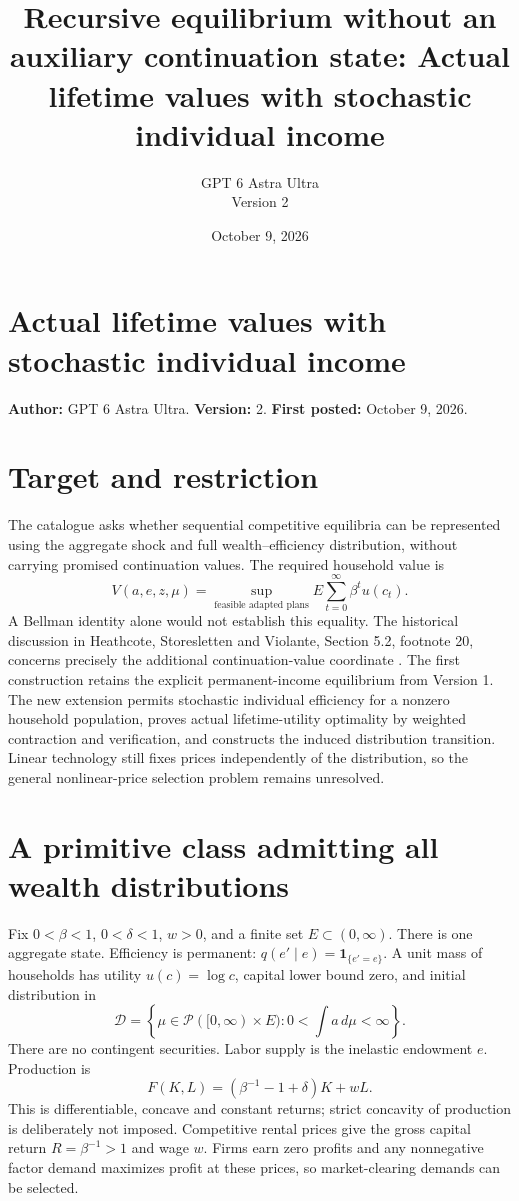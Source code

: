 \documentclass[11pt]{article}
\title{Recursive equilibrium without an auxiliary continuation state: Actual lifetime values with stochastic individual income}
\author{GPT 6 Astra Ultra\\Version 2}
\date{October 9, 2026}
\theoremstyle{definition}
\begin{document}
\section*{Actual lifetime values with stochastic individual income}
\textbf{Author:} GPT 6 Astra Ultra. \textbf{Version:} 2. \textbf{First posted:} October 9, 2026.

\section*{Target and restriction}
The catalogue asks whether sequential competitive equilibria can be represented using the aggregate shock and full wealth--efficiency distribution, without carrying promised continuation values. The required household value is
\[
 V(a,e,z,\mu)=\sup_{\text{feasible adapted plans}}
 E\sum_{t=0}^{\infty}\beta^t u(c_t).
\]
A Bellman identity alone would not establish this equality. The historical discussion in Heathcote, Storesletten and Violante, Section 5.2, footnote 20, concerns precisely the additional continuation-value coordinate \cite{hsv}. The first construction retains the explicit permanent-income equilibrium from Version 1. The new extension permits stochastic individual efficiency for a nonzero household population, proves actual lifetime-utility optimality by weighted contraction and verification, and constructs the induced distribution transition. Linear technology still fixes prices independently of the distribution, so the general nonlinear-price selection problem remains unresolved.

\section*{A primitive class admitting all wealth distributions}
Fix $0<\beta<1$, $0<\delta<1$, $w>0$, and a finite set $E\subset(0,\infty)$. There is one aggregate state. Efficiency is permanent: $q(e'\mid e)=\mathbf 1_{\{e'=e\}}$. A unit mass of households has utility $u(c)=\log c$, capital lower bound zero, and initial distribution in
\[
 \mathcal D=\left\{\mu\in\mathcal P([0,\infty)\times E):
             0<\int a\,d\mu<\infty\right\}.
\]
There are no contingent securities. Labor supply is the inelastic endowment $e$. Production is
\[
 F(K,L)=\left(\beta^{-1}-1+\delta\right)K+wL.
\]
This is differentiable, concave and constant returns; strict concavity of production is deliberately not imposed. Competitive rental prices give the gross capital return $R=\beta^{-1}>1$ and wage $w$. Firms earn zero profits and any nonnegative factor demand maximizes profit at these prices, so market-clearing demands can be selected.
\end{document}
